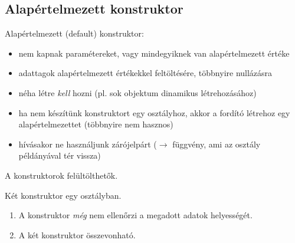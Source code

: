 \documentclass[usenames,dvipsnames,aspectratio=169]{beamer}
\begin{document}
\begin{frame}
    \begin{exampleblock}{}
        \footnotesize
        
    \end{exampleblock}
\end{frame}

\subsection{Alapértelmezett konstruktor}

\begin{frame}
    Alapértelmezett (default) konstruktor:
    \begin{itemize}
        \item nem kapnak paramétereket, vagy mindegyiknek van alapértelmezett értéke
        \item adattagok alapértelmezett értékekkel feltöltésére, többnyire nullázásra
        \item néha létre \emph{kell} hozni (pl. sok objektum dinamikus létrehozásához)
        \item ha nem készítünk konstruktort egy osztályhoz, akkor a fordító létrehoz egy alapértelmezettet (többnyire nem hasznos)
        \item hívásakor ne használjunk zárójelpárt ($\to$ függvény, ami az osztály példányával tér vissza)
    \end{itemize}
    A konstruktorok felültölthetők.
\end{frame}

\begin{frame}
    Két konstruktor egy osztályban.
    \begin{exampleblock}{}
        
    \end{exampleblock}
\end{frame}

\begin{frame}
    \begin{exampleblock}{}
        
    \end{exampleblock}
\end{frame}

\begin{frame}
    \begin{exampleblock}{}
        \footnotesize
        
    \end{exampleblock}
    \vfill
    \begin{enumerate}
        \item A konstruktor \emph{még} nem ellenőrzi a megadott adatok helyességét.
        \item A két konstruktor összevonható.
    \end{enumerate}
\end{frame}
\end{document}
